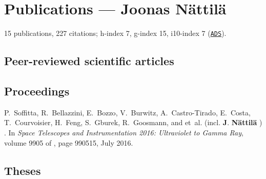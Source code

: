 \documentclass[10pt]{article}
\begin{document}
\section*{Publications --- Joonas N\"attil\"a}
15 publications, 227 citations; h-index 7, g-index 15, i10-index 7 (\href{http://adsabs.harvard.edu/cgi-bin/abs_connect?author=nattila,+J.&aut_syn=YES&return_req=no_params}{\nolinkurl{ADS}}).

\subsection*{\phantom{sub} Peer-reviewed scientific articles}

\vspace{-20pt}
\renewcommand\refname{\phantom{bla}}



\nocite{*}


\subsection*{\phantom{sub} Proceedings}
\vspace{-20pt}
\begin{thebibliography}{1}
\vspace{-5pt}

P.~{Soffitta}, R.~{Bellazzini}, E.~{Bozzo}, V.~{Burwitz}, A.~{Castro-Tirado},
  E.~{Costa}, T.~{Courvoisier}, H.~{Feng}, S.~{Gburek}, R.~{Goosmann}, and
  et~al. (incl. \textbf{J}. \textbf{{N{\"a}ttil{\"a}}} )
.
\newblock In {\em Space Telescopes and Instrumentation 2016: Ultraviolet to
  Gamma Ray}, volume 9905 of {\em \procspie}, page 990515, July 2016.


\end{thebibliography}

\subsection*{\phantom{sub} Theses}
\end{document}
